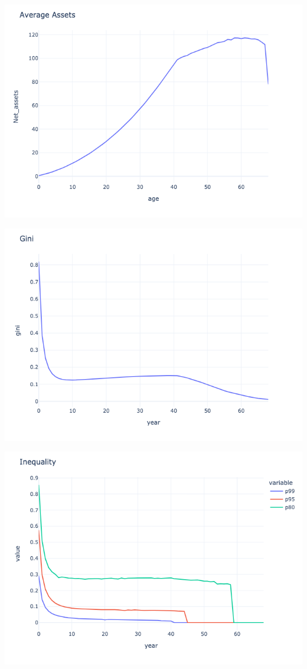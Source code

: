 \begin{questions}
\begin{solution}
\includegraphics[scale=0.5]{figures/avg_assets_-10.png}

\includegraphics[scale=0.5]{figures/gini_-10.png}

\includegraphics[scale=0.5]{figures/inequality_-10.png}

\end{solution}

\end{questions}


